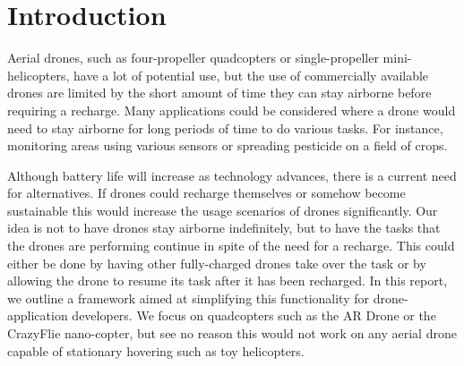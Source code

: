 \section{Introduction}
Aerial drones, such as four-propeller quadcopters or single-propeller mini-helicopters, have a lot of potential use, but the use of commercially available drones are limited by the short amount of time they can stay airborne before requiring a recharge. Many applications could be considered where a drone would need to stay airborne for long periods of time to do various tasks. For instance, monitoring areas using various sensors or spreading pesticide on a field of crops.

Although battery life will increase as technology advances, there is a current need for alternatives. If drones could recharge themselves or somehow become sustainable this would increase the usage scenarios of drones significantly. Our idea is not to have drones stay airborne indefinitely, but to have the tasks that the drones are performing continue in spite of the need for a recharge. This could either be done by having other fully-charged drones take over the task or by allowing the drone to resume its task after it has been recharged. In this report, we outline a framework aimed at simplifying this functionality for drone-application developers. We focus on quadcopters such as the AR Drone or the CrazyFlie nano-copter, but see no reason this would not work on any aerial drone capable of stationary hovering such as toy helicopters.